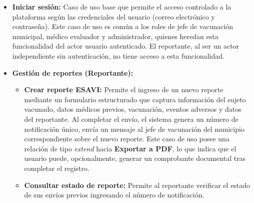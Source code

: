 \documentclass[12pt,letterpaper]{article}
\begin{document}
\begin{itemize}
\item \textbf{Iniciar sesión:} Caso de uso base que permite el acceso controlado a la plataforma según las credenciales del usuario (correo electrónico y contraseña). Este caso de uso es común a los roles de jefe de vacunación municipal, médico evaluador y administrador, quienes heredan esta funcionalidad del actor usuario autenticado. El reportante, al ser un actor independiente sin autenticación, no tiene acceso a esta funcionalidad.

\item \textbf{Gestión de reportes (Reportante):}
\begin{itemize}
\item \textbf{Crear reporte ESAVI:} Permite el ingreso de un nuevo reporte mediante un formulario estructurado que captura información del sujeto vacunado, datos médicos previos, vacunación, eventos adversos y datos del reportante. Al completar el envío, el sistema genera un número de notificación único, envía un mensaje al jefe de vacunación del municipio correspondiente sobre el nuevo reporte. Este caso de uso posee una relación de tipo \textit{extend} hacia \textbf{Exportar a PDF}, lo que indica que el usuario puede, opcionalmente, generar un comprobante documental tras completar el registro.
\item \textbf{Consultar estado de reporte:} Permite al reportante verificar el estado de sus envíos previos ingresando el número de notificación.
\end{itemize}


\end{itemize}
\end{document}
